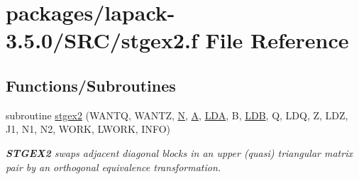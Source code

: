 \hypertarget{stgex2_8f}{}\section{packages/lapack-\/3.5.0/\+S\+R\+C/stgex2.f File Reference}
\label{stgex2_8f}
\subsection*{Functions/\+Subroutines}
\begin{DoxyCompactItemize}
\item 
subroutine \hyperlink{group__realGEauxiliary_ga291b344e4ed84af6cdba9a6d1efce24b}{stgex2} (W\+A\+N\+T\+Q, W\+A\+N\+T\+Z, \hyperlink{polmisc_8c_a0240ac851181b84ac374872dc5434ee4}{N}, \hyperlink{classA}{A}, \hyperlink{example__user_8c_ae946da542ce0db94dced19b2ecefd1aa}{L\+D\+A}, B, \hyperlink{example__user_8c_a50e90a7104df172b5a89a06c47fcca04}{L\+D\+B}, Q, L\+D\+Q, Z, L\+D\+Z, J1, N1, N2, W\+O\+R\+K, L\+W\+O\+R\+K, I\+N\+F\+O)
\begin{DoxyCompactList}\small\item\em {\bfseries S\+T\+G\+E\+X2} swaps adjacent diagonal blocks in an upper (quasi) triangular matrix pair by an orthogonal equivalence transformation. \end{DoxyCompactList}\end{DoxyCompactItemize}
